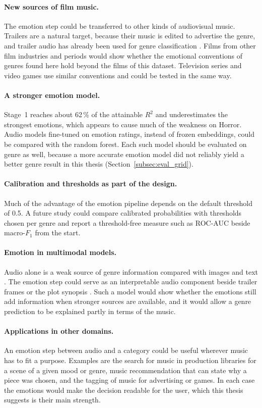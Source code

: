\paragraph{New sources of film music.} The emotion step could be transferred to other kinds
of audiovisual music. Trailers are a natural target, because their music is edited to
advertise the genre, and trailer audio has already been used for genre classification
\citep{mangolin2020multimodal}. Films from other film industries and periods would show
whether the emotional conventions of genres found here hold beyond the films of this dataset.
Television series and video games use similar conventions and could be tested in the same
way.

\paragraph{A stronger emotion model.} Stage~1 reaches about 62\,\% of the attainable $R^2$
and underestimates the strongest emotions, which appears to cause much of the weakness on
Horror. Audio models fine-tuned on emotion ratings, instead of frozen embeddings, could be
compared with the random forest. Each such model should be evaluated on genre as well,
because a more accurate emotion model did not reliably yield a better genre result in this
thesis (Section~\ref{subsec:eval_grid}).

\paragraph{Calibration and thresholds as part of the design.} Much of the advantage of the
emotion pipeline depends on the default threshold of 0.5. A future study could compare
calibrated probabilities with thresholds chosen per genre \citep{lipton2014optimal} and
report a threshold-free measure such as ROC-AUC beside macro-$F_1$ from the start.

\paragraph{Emotion in multimodal models.} Audio alone is a weak source of genre information
compared with images and text \citep{mangolin2020multimodal}. The emotion step could serve
as an interpretable audio component beside trailer frames or the plot synopsis
\citep{behrouzi2023multimodal}. Such a model would show whether the emotions still add
information when stronger sources are available, and it would allow a genre prediction to
be explained partly in terms of the music.

\paragraph{Applications in other domains.} An emotion step between audio and a category
could be useful wherever music has to fit a purpose. Examples are the search for music in
production libraries for a scene of a given mood or genre, music recommendation that can
state why a piece was chosen, and the tagging of music for advertising or games. In each
case the emotions would make the decision readable for the user, which this thesis suggests
is their main strength.
